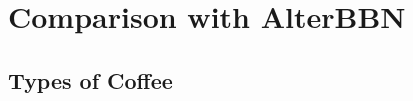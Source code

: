 \chapter{Comparison with AlterBBN}
\label{chap:Alter}





\section{Types of Coffee}
\label{sec:intro_alter}